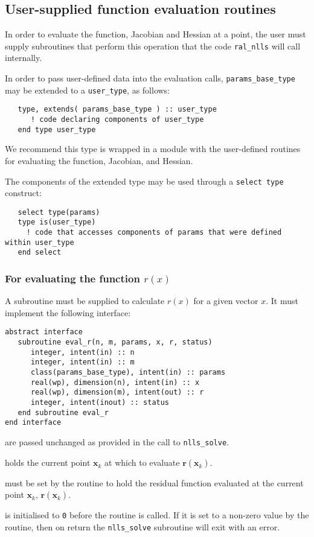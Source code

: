 \documentclass{spec}
\newcommand{\vx}{ {\bm x} } %
\newcommand{\vr}{ {\bm r} } %
\newcommand{\iter}[2][k]{ #2_{#1}^{}} %
\begin{document}
\subsection{User-supplied function evaluation routines}
\label{sec::function_eval}
In order to evaluate the function, Jacobian and Hessian at a point, the user
must supply subroutines that perform this operation that the code
{\tt ral\_nlls} will call internally.  

In order to pass user-defined data into the evaluation calls, {\tt params\_base\_type} may be extended to a {\tt user\_type}, as follows:
\begin{verbatim}
   type, extends( params_base_type ) :: user_type
      ! code declaring components of user_type 
   end type user_type
\end{verbatim}
We recommend this type is wrapped in a module with the user-defined routines
for evaluating the function, Jacobian, and Hessian.

The components of the extended type may be used through a \texttt{select type}
construct:
\begin{verbatim}
   select type(params)
   type is(user_type)
     ! code that accesses components of params that were defined within user_type 
   end select
\end{verbatim}

\subsubsection{For evaluating the function $r(x)$}
A subroutine must be supplied to calculate $r(x)$ for a given vector $x$. It
must implement the following interface:

\begin{verbatim}
abstract interface
   subroutine eval_r(n, m, params, x, r, status)
      integer, intent(in) :: n
      integer, intent(in) :: m
      class(params_base_type), intent(in) :: params
      real(wp), dimension(n), intent(in) :: x
      real(wp), dimension(m), intent(out) :: r
      integer, intent(inout) :: status
   end subroutine eval_r
end interface
\end{verbatim}

\begin{description}
    are passed unchanged as provided in the call to
      {\tt nlls\_solve}.

       holds the current point $\iter{\vx}$ at which to evaluate $\vr(\iter{\vx})$.
  
    must be set by the routine to hold the residual function 
      evaluated at the current point $\iter{\vx}$, $\vr(\iter{\vx})$.

    is initialised to \texttt{0} before the routine is
      called. If it is set to a non-zero value by the routine, then on return
      the {\tt nlls\_solve} subroutine will exit with an error.
\end{description}
\end{document}
